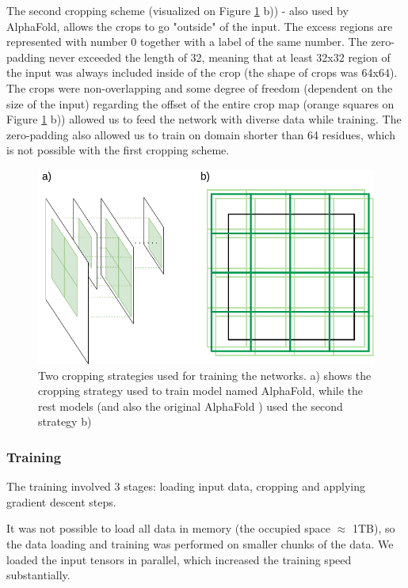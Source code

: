 The second cropping scheme (visualized on Figure \ref{fig:cropping} b)) - also used by AlphaFold, allows the crops to go "outside" of the input. The excess regions are represented with number 0 together with a label of the same number. The zero-padding never exceeded the length of 32, meaning that at least 32x32 region of the input was always included inside of the crop (the shape of crops was 64x64). The crops were non-overlapping and some degree of freedom (dependent on the size of the input) regarding the offset of the entire crop map (orange squares on Figure \ref{fig:cropping} b)) allowed us to feed the network with diverse data while training. The zero-padding also allowed us to train on domain shorter than 64 residues, which is not possible with the first cropping scheme.

\begin{figure}
    \centering
    \includegraphics[width=\linewidth]{imgs_tomas/cropping_schemes.png}
    \caption{Two cropping strategies used for training the networks. a) shows the cropping strategy used to train model named AlphaFold, while the rest models (and also the original AlphaFold \cite{alphafold}) used the second strategy b)}
    \label{fig:cropping}
\end{figure}

\subsubsection{Training}

The training involved 3 stages: loading input data, cropping and applying gradient descent steps.

It was not possible to load all data in memory (the occupied space $\approx$ 1TB), so the data loading and training was performed on smaller chunks of the data. We loaded the input tensors in parallel, which increased the training speed substantially.

